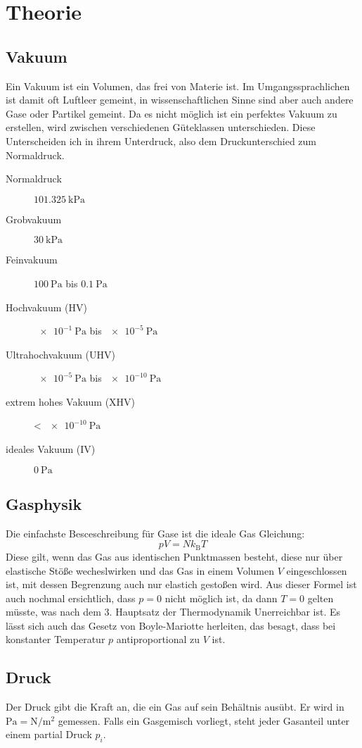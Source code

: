 \section{Theorie}
\label{sec:Theorie}
\subsection{Vakuum}
Ein Vakuum ist ein Volumen, das frei von Materie ist. Im Umgangssprachlichen ist damit oft Luftleer gemeint, in wissenschaftlichen Sinne sind aber auch andere
Gase oder Partikel gemeint. Da es nicht möglich ist ein perfektes Vakuum zu erstellen, wird zwischen verschiedenen Güteklassen unterschieden. Diese
Unterscheiden ich in ihrem Unterdruck, also dem Druckunterschied zum Normaldruck.
\begin{description}
	\item[Normaldruck] $\SI{101.325}{\kilo \pascal}$
	\item[Grobvakuum] $\SI{30}{\kilo \pascal}$
	\item[Feinvakuum] $\SI{100}{\pascal}$ bis $\SI{0.1}{\pascal}$
	\item[Hochvakuum (HV)] $\SI{e-1}{\pascal}$ bis $\SI{e-5}{\pascal}$
	\item[Ultrahochvakuum (UHV)] $\SI{e-5}{\pascal}$ bis $\SI{e-10}{\pascal}$
	\item[extrem hohes Vakuum (XHV)] < $\SI{e-10}{\pascal}$
	\item[ideales Vakuum (IV)] $\SI{0}{\pascal}$
\end{description}
\subsection{Gasphysik}
Die einfachste Besceschreibung für Gase ist die ideale Gas Gleichung:
\begin{equation}
	pV=Nk_\text{B}T
\end{equation}
Diese gilt, wenn das Gas aus identischen Punktmassen besteht, diese nur über elastische Stöße wecheslwirken und das Gas in einem Volumen $V$ eingeschlossen
ist, mit dessen Begrenzung auch nur elastich gestoßen wird. Aus dieser Formel ist auch nochmal ersichtlich, dass $p=0$ nicht möglich ist, da dann $T=0$ gelten
müsste, was nach dem 3. Hauptsatz der Thermodynamik Unerreichbar ist. Es lässt sich auch das Gesetz von Boyle-Mariotte herleiten, das besagt, dass bei
 konstanter Temperatur $p$ antiproportional zu $V$ ist.
\subsection{Druck}
Der Druck gibt die Kraft an, die ein Gas auf sein Behältnis ausübt. Er wird in $\si{\pascal}=\si{\newton \per \meter \squared}$ gemessen. Falls ein Gasgemisch
 vorliegt, steht jeder Gasanteil unter einem partial Druck $p_i$.

